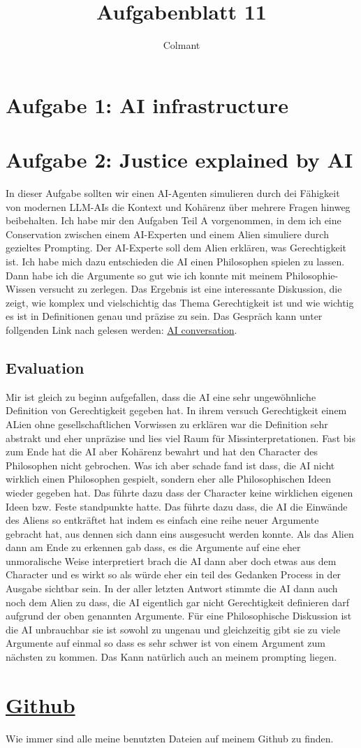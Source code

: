 \documentclass[a4paper,12pt]{scrartcl}
\title{Aufgabenblatt 11}
\begin{document}
\author{Colmant}
\maketitle
\newpage
\section*{Aufgabe 1: AI infrastructure}


\section*{Aufgabe 2: Justice explained by AI}
In dieser Aufgabe sollten wir einen AI-Agenten simulieren durch dei Fähigkeit von modernen LLM-AIs die Kontext und Kohärenz über mehrere Fragen hinweg beibehalten. Ich habe mir den Aufgaben Teil A vorgenommen, in dem ich eine Conservation zwischen einem AI-Experten und einem Alien simuliere durch gezieltes Prompting. Der AI-Experte soll dem Alien erklären, was Gerechtigkeit ist. Ich habe mich dazu entschieden die AI einen Philosophen spielen zu lassen. Dann habe ich die Argumente so gut wie ich konnte mit meinem Philosophie-Wissen versucht zu zerlegen. Das Ergebnis ist eine interessante Diskussion, die zeigt, wie komplex und vielschichtig das Thema Gerechtigkeit ist und wie wichtig es ist in Definitionen genau und präzise zu sein. Das Gespräch kann unter follgenden Link nach gelesen werden: \href{https://g.co/gemini/share/98469b7d8c1a}{AI conversation}.
\subsection*{Evaluation}
Mir ist gleich zu beginn aufgefallen, dass die AI eine sehr ungewöhnliche Definition von Gerechtigkeit gegeben hat. In ihrem versuch Gerechtigkeit einem ALien ohne gesellschaftlichen Vorwissen zu erklären war die Definition sehr abstrakt und eher unpräzise und lies viel Raum für Missinterpretationen. Fast bis zum Ende hat die AI aber Kohärenz bewahrt und hat den Character des Philosophen nicht gebrochen. Was ich aber schade fand ist dass, die AI nicht wirklich einen Philosophen gespielt, sondern eher alle Philosophischen Ideen wieder gegeben hat. Das führte dazu dass der Character keine wirklichen eigenen Ideen bzw. Feste standpunkte hatte. Das führte dazu dass, die AI die Einwände des Aliens so entkräftet hat indem es einfach eine reihe neuer Argumente gebracht hat, aus dennen sich dann eins ausgesucht werden konnte. Als das Alien dann am Ende zu erkennen gab dass, es die Argumente auf eine eher unmoralische Weise interpretiert brach die AI dann aber doch etwas aus dem Character und es wirkt so als würde eher ein teil des Gedanken Process in der Ausgabe sichtbar sein. In der aller letzten Antwort stimmte die AI dann auch noch dem Alien zu dass, die AI eigentlich gar nicht Gerechtigkeit definieren darf aufgrund der oben genannten Argumente. Für eine Philosophische Diskussion ist die AI unbrauchbar sie ist sowohl zu ungenau und gleichzeitig gibt sie zu viele Argumente auf einmal so dass es sehr schwer ist von einem Argument zum nächsten zu kommen. Das Kann natürlich auch an meinem prompting liegen.


\section*{\href{https://github.com/7hands/Angewandte-Modellierung-25-Colmant}{Github}}
Wie immer sind alle meine benutzten Dateien auf meinem Github zu finden. 
\end{document}
